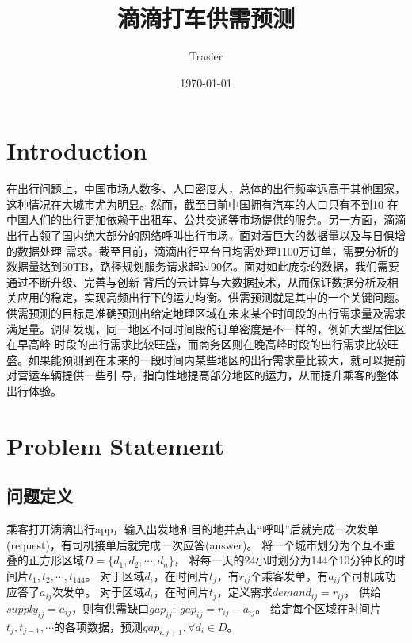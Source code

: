 \documentclass[hyperref,UTF8]{ctexart}
\theoremstyle{definition}
\theoremstyle{remark}
\numberwithin{equation}{subsection}
\begin{document}
\title{\Huge 滴滴打车供需预测}
\vspace{2cm}
\author{\Large Trasier}
\date{\today}
\maketitle

\section{Introduction}
\label{sec:introduction}

	在出行问题上，中国市场人数多、人口密度大，总体的出行频率远高于其他国家，这种情况在大城市尤为明显。然而，截至目前中国拥有汽车的人口只有不到10%
在中国人们的出行更加依赖于出租车、公共交通等市场提供的服务。另一方面，滴滴出行占领了国内绝大部分的网络呼叫出行市场，面对着巨大的数据量以及与日俱增的数据处理
需求。截至目前，滴滴出行平台日均需处理1100万订单，需要分析的数据量达到50TB，路径规划服务请求超过90亿。面对如此庞杂的数据，我们需要通过不断升级、完善与创新
背后的云计算与大数据技术，从而保证数据分析及相关应用的稳定，实现高频出行下的运力均衡。供需预测就是其中的一个关键问题。
供需预测的目标是准确预测出给定地理区域在未来某个时间段的出行需求量及需求满足量。调研发现，同一地区不同时间段的订单密度是不一样的，例如大型居住区在早高峰
时段的出行需求比较旺盛，而商务区则在晚高峰时段的出行需求比较旺盛。如果能预测到在未来的一段时间内某些地区的出行需求量比较大，就可以提前对营运车辆提供一些引
导，指向性地提高部分地区的运力，从而提升乘客的整体出行体验。

\section{Problem Statement}
\label{sec:prob_statement}

\subsection{问题定义}	
\label{subsec:prob_definition}
	
	乘客打开滴滴出行app，输入出发地和目的地并点击“呼叫”后就完成一次发单(request)，有司机接单后就完成一次应答(answer)。
将一个城市划分为个互不重叠的正方形区域$D = \{d_1, d_2, \cdots, d_n\}$，
将每一天的24小时划分为144个10分钟长的时间片$t_1, t_2, \cdots, t_{144}$。
对于区域$d_i$，在时间片$t_j$，有$r_{ij}$个乘客发单，有$a_{ij}$个司机成功应答了$a_{ij}$次发单。
对于区域$d_i$，在时间片$t_j$，定义需求$demand_{ij} = r_{ij}$，
供给$supply_{ij} = a_{ij}$，则有供需缺口$gap_{ij}:\ gap_{ij} = r_{ij} - a_{ij}$。
给定每个区域在时间片$t_j, t_{j-1}, \cdots$的各项数据，预测$gap_{i,j+1}, \forall d_i \in D$。
	
\end{document}
